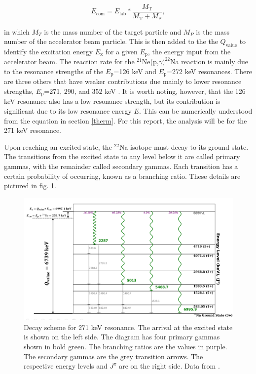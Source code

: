 \documentclass[a4paper,12pt]{article}
\def\reac{$^{21}$Ne(p,$\gamma)^{22}$Na reaction }
\begin{document}
    \[E_{\text{com}} = E_{\text{lab}} * \frac{M_{\text{T}}}{M_{\text{T}} + M_{\text{P}}},\]

    in which $M_T$ is the mass number of the target particle and $M_P$ is the mass number of the accelerator beam particle.  This is then added to the the $Q_{\text{value}}$ to identify the excitation energy $E_{\text{x}}$ for a given $E_{\text{p}}$, the energy input from the accelerator beam.  The reaction rate for the \reac is mainly due to the resonance strengths of the $E_{\text{p}}$=126 keV and $E_{\text{p}}$=272 keV resonances.  There are three others that have weaker contributions due mainly to lower resonance strengths, $E_{\text{p}}$=271, 290, and 352 keV \cite{GORRES1983372}.  It is worth noting, however, that the 126 keV resonance also has a low resonance strength, but its contribution is significant due to its low resonance energy $E$.  This can be numerically understood from the equation in section \ref{therm}.  For this report, the analysis will be for the 271 keV resonance. 

    Upon reaching an excited state, the $^{22}$Na isotope must decay to its ground state.  The transitions from the excited state to any level below it are called primary gammas, with the remainder called secondary gammas.  Each transition has a certain probability of occurring, known as a branching ratio.  These details are pictured in fig. \ref{fig:reac}.  

    \begin{figure}[H]
        \centering
        \includegraphics[width=15cm]{reac.png}
        \caption{Decay scheme for 271 keV resonance.  The arrival at the excited state is shown on the left side. 
 The diagram has four primary gammas shown in bold green.  The branching ratios are the values in purple.  The secondary gammas are the grey transition arrows.  The respective energy levels and $J^{\pi}$ are on the right side. Data from \cite{NNDCNuDat22Na}.}
        \label{fig:reac}
    \end{figure}
\end{document}
